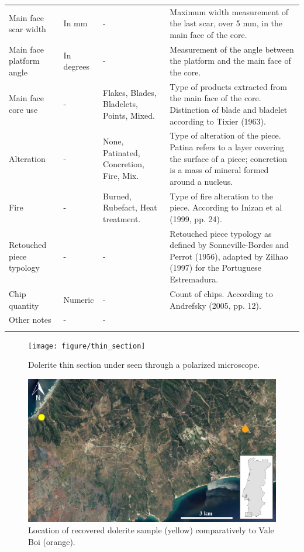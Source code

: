 \documentclass[12pt,twoside]{reedthesis}
\begin{document}
\begin{landscape}
\begin{longtable}[t]{>{\raggedright\arraybackslash}p{2cm}>{\raggedright\arraybackslash}p{3cm}>{\raggedright\arraybackslash}p{6cm}>{\raggedright\arraybackslash}p{9cm}}
Main face scar width & In mm & - & Maximum width measurement of the last scar, over 5 mm, in the main face of the core.\\
Main face platform angle & In degrees & - & Measurement of the angle between the platform and the main face of the core.\\
\addlinespace
Main face core use & - & Flakes, Blades, Bladelets, Points, Mixed. & Type of products extracted from the main face of the core. Distinction of blade and bladelet according to Tixier (1963).\\
Alteration & - & None, Patinated, Concretion, Fire, Mix. & Type of alteration of the piece. Patina refers to a layer covering the surface of a piece; concretion is a mass of mineral formed around a nucleus.\\
Fire & - & Burned, Rubefact, Heat treatment. & Type of fire alteration to the piece. According to Inizan et al (1999, pp. 24).\\
Retouched piece typology & - & - & Retouched piece typology as defined by Sonneville-Bordes and Perrot (1956), adapted by Zilhao (1997) for the Portuguese Estremadura.\\
Chip quantity & Numeric & - & Count of chips. According to Andrefsky (2005, pp. 12).\\
\addlinespace
Other notes & - & - & \\*
\end{longtable}
\end{landscape}
\begin{figure}
\texttt{[image: figure/thin\_section]} \caption{Dolerite thin section under seen through a polarized microscope.}\label{fig:unnamed-chunk-55}
\end{figure}
\begin{figure}
\includegraphics[width=1\linewidth]{figure/dolerite_sample} \caption{Location of recovered dolerite sample (yellow) comparatively to Vale Boi (orange).}\label{fig:unnamed-chunk-56}
\end{figure}
\end{document}
